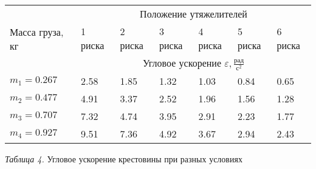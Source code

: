 \begin{center}
    \begin{tabular}{|p{2.5cm}|p{1.5cm}|p{1.5cm}|p{1.5cm}|p{1.5cm}|p{1.5cm}|p{1.5cm}|}
        \hline
        \multirow{3}{2.5cm}{Масса груза, кг} & \multicolumn{6}{c|}{Положение утяжелителей} \\
        \cline{2-7}
        & 1 риска       & 2 риска & 3 риска & 4 риска & 5 риска & 6 риска \\
        \cline{2-7}
        & \multicolumn{6}{c|}{Угловое ускорение $\varepsilon, \frac{\text{рад}}{\text{с}^{2}}$} \\
        \hline
        $m_1 = 0.267$ &   2.58    &   1.85    &    1.32   &    1.03   &    0.84   &   0.65    \\
        \hline
        $m_2 = 0.477$ &   4.91    &   3.37    &    2.52   &    1.96   &    1.56   &   1.28    \\
        \hline
        $m_3 = 0.707$ &   7.32    &   4.74    &    3.95   &    2.91   &    2.23   &   1.77    \\
        \hline
        $m_4 = 0.927$ &   9.51    &   7.36    &    4.92   &    3.67   &    2.94   &   2.43    \\
        \hline

    \end{tabular}

    \smallvspace

    \textit{Таблица 4.} Угловое ускорение крестовины при разных условиях
\end{center}
